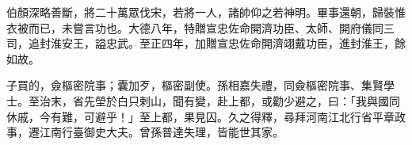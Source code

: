 \begin{pinyinscope}
 伯顏深略善斷，將二十萬眾伐宋，若將一人，諸帥仰之若神明。畢事還朝，歸裝惟衣被而已，未嘗言功也。大德八年，特贈宣忠佐命開濟功臣、太師、開府儀同三司，追封淮安王，謚忠武。至正四年，加贈宣忠佐命開濟翊戴功臣，進封淮王，餘如故。



 子買的，僉樞密院事；囊加歹，樞密副使。孫相嘉失禮，同僉樞密院事、集賢學士。至治末，省先塋於白只剌山，聞有變，赴上都，或勸少避之，曰：「我與國同休戚，今有難，可避乎！」至上都，果見囚。久之得釋，尋拜河南江北行省平章政事，遷江南行臺御史大夫。曾孫普達失理，皆能世其家。



\end{pinyinscope}